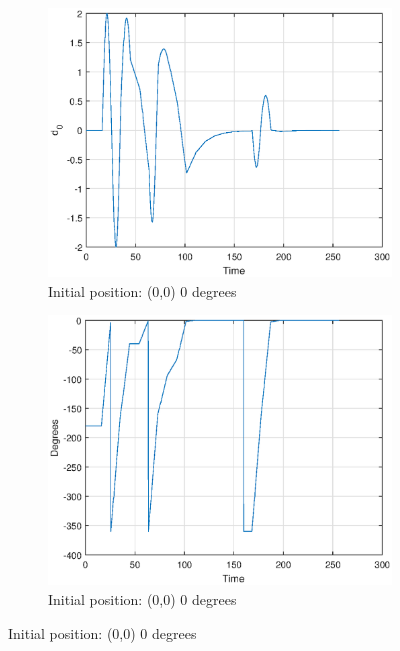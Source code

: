 \begin{figure}[H]
    \centering
    \begin{subfigure}[b]{6cm}
        \includegraphics[width=\textwidth]{task_9_500_d0_initial_000_Goal_02180.eps}
        \caption{Initial position: (0,0) 0 degrees}
        \label{fig:d0009002180}
    \end{subfigure}
    \begin{subfigure}[b]{6cm}
        \includegraphics[width=\textwidth]{task_9_500_deg_initial_000_Goal_02180.eps}
        \caption{Initial position: (0,0) 0 degrees}
        \label{fig:deg009002180}
    \end{subfigure}
   

\end{figure}
